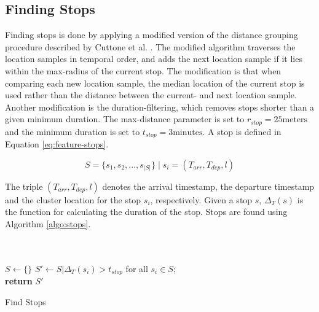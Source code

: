 \subsection{Finding Stops}
Finding stops is done by applying a modified version of the distance grouping procedure described by Cuttone et al. \cite{sparse-location-2014}. The modified algorithm traverses the location samples in temporal order, and adds the next location sample if it lies within the max-radius of the current stop. The modification is that when comparing each new location sample, the median location of the current stop is used rather than the distance between the current- and next location sample. Another modification is the duration-filtering, which removes stops shorter than a given minimum duration. The max-distance parameter is set to $r_{stop} = 25 \text{meters}$ and the minimum duration is set to $t_{stop} = 3 \text{minutes}$. A stop is defined in Equation \eqref{eq:feature-stops}.

\begin{equation}
\label{eq:feature-stops}
S = \{s_1, s_2, ..., s_{|S|}\} \;| \; s_i = (T_{arr}, T_{dep}, l)
\end{equation}

The triple $(T_{arr}, T_{dep}, l)$ denotes the arrival timestamp, the departure timestamp and the cluster location for the stop $s_i$, respectively. Given a stop $s$, $\Delta_ T(s)$ is the function for calculating the duration of the stop. Stops are found using Algorithm \ref{algo:stops}.

\begin{algorithm}[H]
\SetAlgoLined
{}\\
\\

 $S \leftarrow \{ \}$\;
 $S' \leftarrow S | \Delta_ T(s_i) > t_{stop}$ for all $s_i \in S$;\\
 \textbf{return} $S'$\;
 \label{algo:stops}
 \caption{Find Stops}
\end{algorithm}

